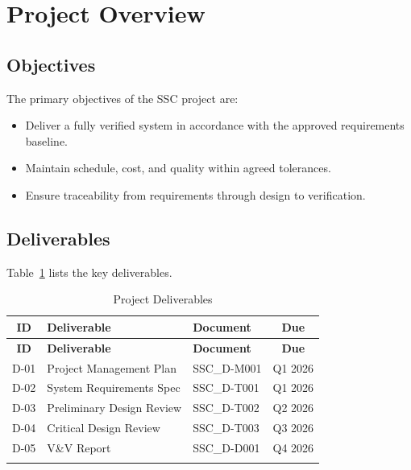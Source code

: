 \documentclass[12pt,a4paper]{article}
\begin{document}
\section{Project Overview}

\subsection{Objectives}
The primary objectives of the SSC project are:
\begin{itemize}
  \item Deliver a fully verified system in accordance with the approved
        requirements baseline.
  \item Maintain schedule, cost, and quality within agreed tolerances.
  \item Ensure traceability from requirements through design to verification.
\end{itemize}

\subsection{Deliverables}
Table~\ref{tab:deliverables} lists the key deliverables.

\begin{longtable}{|c|l|l|c|}
  \hline
  \rowcolor{lightgray}
  \textbf{ID} & \textbf{Deliverable} & \textbf{Document} & \textbf{Due} \\
  \hline
  \endfirsthead
  \hline
  \rowcolor{lightgray}
  \textbf{ID} & \textbf{Deliverable} & \textbf{Document} & \textbf{Due} \\
  \hline
  \endhead
  D-01 & Project Management Plan   & SSC\_D-M001 & Q1 2026 \\
  D-02 & System Requirements Spec  & SSC\_D-T001 & Q1 2026 \\
  D-03 & Preliminary Design Review & SSC\_D-T002 & Q2 2026 \\
  D-04 & Critical Design Review    & SSC\_D-T003 & Q3 2026 \\
  D-05 & V\&V Report               & SSC\_D-D001 & Q4 2026 \\
  \hline
  \caption{Project Deliverables}
  \label{tab:deliverables}
\end{longtable}

\end{document}

